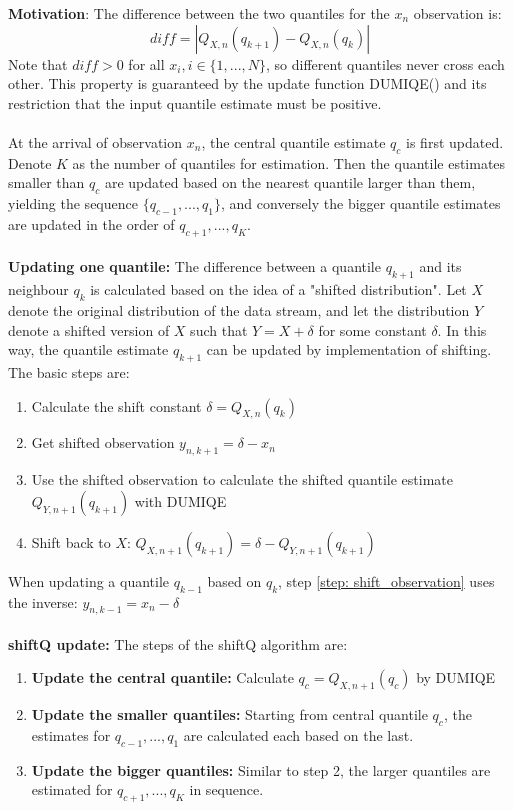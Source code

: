 \textbf{Motivation}: The difference between the two quantiles for the $x_{n}$ observation is:
$$
diff = |Q_{X,n}(q_{k+1}) - Q_{X,n}(q_k)|
$$
Note that $diff > 0$ for all $x_i, i \in \{1,...,N\}$, so different quantiles never cross each other. This property is guaranteed by the update function DUMIQE() and its restriction that the input quantile estimate must be positive.
\\\\
At the arrival of observation $x_n$, the central quantile estimate $q_c$ is first updated. Denote $K$ as the number of quantiles for estimation. Then the quantile estimates smaller than $q_c$ are updated based on the nearest quantile larger than them, yielding the sequence $\{q_{c-1}, ..., q_1\}$, and conversely the bigger quantile estimates are updated in the order of {$q_{c+1}, ..., q_{K}$}.
\\\\
\textbf{Updating one quantile:} The difference between a quantile $q_{k+1}$ and its neighbour $q_k$ is calculated based on the idea of a "shifted distribution".
Let $X$ denote the original distribution of the data stream, and let the distribution $Y$ denote a shifted version of $X$ such that $Y = X + \delta$ for some constant $\delta$. In this way, the quantile estimate $q_{k+1}$ can be updated by implementation of shifting. The basic steps are:
        \begin{enumerate}
            \item Calculate the shift constant $\delta = Q_{X,n}(q_k)$
            \item Get shifted observation $y_{n,k+1} =  \delta - x_n$ \label{step: shift_observation}
            \item Use the shifted observation to calculate the shifted quantile estimate $Q_{Y, n+1}(q_{k+1})$ with DUMIQE
            \item Shift back to $X$: $Q_{X,n+1}(q_{k+1}) =  \delta  - Q_{Y, n+1}(q_{k+1})$
        \end{enumerate}
When updating a quantile $q_{k-1}$ based on $q_k$, step \ref{step: shift_observation} uses the inverse: $y_{n,k-1} = x_n - \delta$
\\\\
\noindent\textbf{shiftQ update:}
The steps of the shiftQ algorithm are:
\begin{enumerate}
    \item \textbf{Update the central quantile:} Calculate $q_c = Q_{X,n+1}(q_c)$ by DUMIQE 
    \item \textbf{Update the smaller quantiles:} Starting from central quantile $q_c$, the estimates for $q_{c-1}, ..., q_{1}$ are calculated each based on the last.
    \item  \textbf{Update the bigger quantiles:} Similar to step 2, the larger quantiles are estimated for $q_{c+1}, ..., q_{K}$ in sequence.
\end{enumerate}

